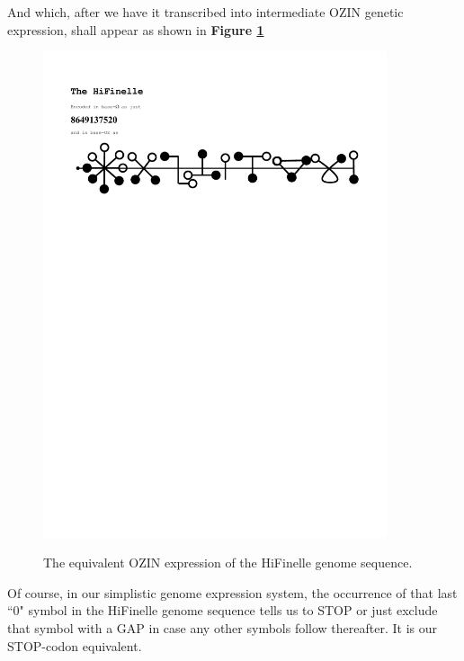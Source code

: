 \documentclass[a4paper, 18pt]{book} %
\begin{document}
And which, after we have it transcribed into intermediate OZIN genetic expression, shall appear as shown in \textbf{Figure \ref{FIGOZHIFI}}


\begin{figure}[H]
  \begin{center}
   \includegraphics[trim=0cm 20cm 0cm 0cm, clip, width=0.9\textwidth,]{resources/pdfs/OZINCIPHER-APP2-HIFINELLE.pdf}\\
   \caption{The equivalent OZIN expression of the HiFinelle genome sequence.}
  \label{FIGOZHIFI}
  \end{center}
\end{figure}

Of course, in our simplistic genome expression system, the occurrence of that last ``0" symbol in the HiFinelle genome sequence tells us to STOP or just exclude that symbol with a GAP in case any other symbols follow thereafter. It is our STOP-codon equivalent.
\end{document}

